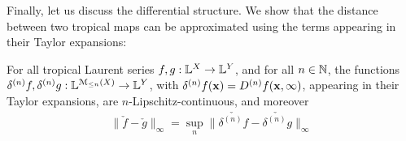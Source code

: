 Finally, let us discuss the differential structure. We show that the distance between two tropical maps can be approximated using the terms appearing in their Taylor expansions:
\begin{proposition}
For all tropical Laurent series $f,g: \mathbb{L}^{X}\to \mathbb{L}^{Y}$, and for all $n\in \mathbb{N}$, 
the functions
$\delta^{(n)}f, \delta^{(n)}g: \mathbb{L}^{\mathcal{M}_{\leq n}(X)}\to \mathbb{L} ^{Y}$, with 
 $\delta^{(n)}f(\B x)= \Der^{(n)}f(\B x, \infty)$, appearing in their Taylor expansions, are $n$-Lipschitz-continuous, and moreover 
\begin{align}
\| \check f-\check g\|_{\infty}= \sup_{n} \| \check{\delta^{(n)}f}- \check{\delta^{(n)}g}\|_{\infty}
\end{align}
\end{proposition} 


